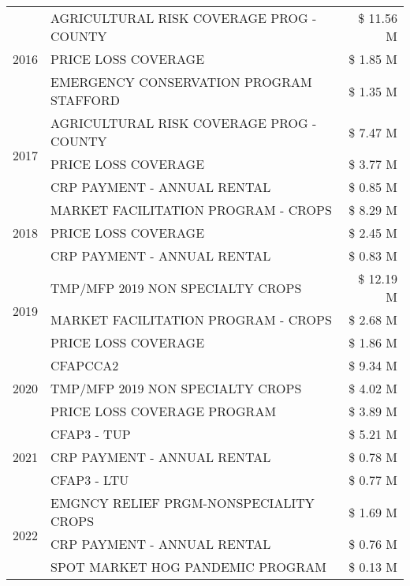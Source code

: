 \begin{tabular}{llr}
\cline{1-3}
\multirow[t]{3}{*}{2016} & AGRICULTURAL RISK COVERAGE PROG - COUNTY & \$ 11.56 M \\
 & PRICE LOSS COVERAGE & \$ 1.85 M \\
 & EMERGENCY CONSERVATION PROGRAM STAFFORD & \$ 1.35 M \\
\cline{1-3}
\multirow[t]{3}{*}{2017} & AGRICULTURAL RISK COVERAGE PROG - COUNTY & \$ 7.47 M \\
 & PRICE LOSS COVERAGE & \$ 3.77 M \\
 & CRP PAYMENT - ANNUAL RENTAL & \$ 0.85 M \\
\cline{1-3}
\multirow[t]{3}{*}{2018} & MARKET FACILITATION PROGRAM - CROPS & \$ 8.29 M \\
 & PRICE LOSS COVERAGE & \$ 2.45 M \\
 & CRP PAYMENT - ANNUAL RENTAL & \$ 0.83 M \\
\cline{1-3}
\multirow[t]{3}{*}{2019} & TMP/MFP 2019 NON SPECIALTY CROPS & \$ 12.19 M \\
 & MARKET FACILITATION PROGRAM - CROPS & \$ 2.68 M \\
 & PRICE LOSS COVERAGE & \$ 1.86 M \\
\cline{1-3}
\multirow[t]{3}{*}{2020} & CFAPCCA2 & \$ 9.34 M \\
 & TMP/MFP 2019 NON SPECIALTY CROPS & \$ 4.02 M \\
 & PRICE LOSS COVERAGE PROGRAM & \$ 3.89 M \\
\cline{1-3}
\multirow[t]{3}{*}{2021} & CFAP3 - TUP & \$ 5.21 M \\
 & CRP PAYMENT - ANNUAL RENTAL & \$ 0.78 M \\
 & CFAP3 - LTU & \$ 0.77 M \\
\cline{1-3}
\multirow[t]{3}{*}{2022} & EMGNCY RELIEF PRGM-NONSPECIALITY CROPS & \$ 1.69 M \\
 & CRP PAYMENT - ANNUAL RENTAL & \$ 0.76 M \\
 & SPOT MARKET HOG PANDEMIC PROGRAM & \$ 0.13 M \\
\cline{1-3}
\bottomrule
\end{tabular}
